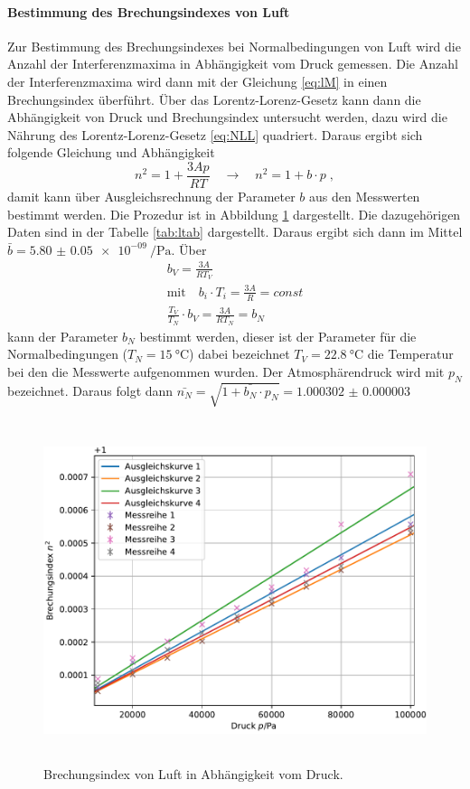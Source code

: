 \paragraph{Bestimmung des Brechungsindexes von Luft}
Zur Bestimmung des Brechungsindexes bei Normalbedingungen von Luft wird die Anzahl der Interferenzmaxima 
in Abhängigkeit vom Druck gemessen. Die Anzahl der Interferenzmaxima wird dann mit der Gleichung 
\eqref{eq:lM} in einen Brechungsindex überführt. Über das Lorentz-Lorenz-Gesetz kann dann die 
Abhängigkeit von Druck und Brechungsindex untersucht werden, dazu wird die Nährung des Lorentz-Lorenz-Gesetz 
\eqref{eq:NLL} quadriert. 
Daraus ergibt sich folgende Gleichung und Abhängigkeit
\begin{equation}
n^2 = 1 + \frac{3Ap}{RT} \quad \rightarrow \quad n^2 = 1+ b \cdot p \; ,
\label{eq:brechl}
\end{equation}
damit kann über Ausgleichsrechnung der Parameter $b$ aus den Messwerten bestimmt werden. 
Die Prozedur ist in Abbildung \ref{fig:Lplot} dargestellt. 
Die dazugehörigen Daten sind in der Tabelle \ref{tab:ltab} dargestellt. 
Daraus ergibt sich dann im Mittel $ \bar{b} = \SI{5.80(5)e-09}{\per\Pa}$. 
Über 
\begin{gather}
b_V =  \frac{3A}{RT_V} \\ 
\text{mit} \quad b_i \cdot T_i = \frac{3A}{R} = const\\
\frac{T_V}{T_N} \cdot b_V =\frac{3A}{RT_N} = b_N
\end{gather}
kann der Parameter $b_N$ bestimmt werden, dieser ist der Parameter für die Normalbedingungen 
($T_N = \SI{15}{\celsius}$) dabei bezeichnet $T_V = \SI{22,8}{\celsius}$ die Temperatur bei den die 
Messwerte aufgenommen wurden. Der Atmosphärendruck wird mit $p_N$ bezeichnet. 
Daraus folgt dann $ \bar{n_{N}} = \sqrt{ 1 +  \bar{b_{N}}\cdot p_{N}} = \SI{1.000302(3)}{}$
\begin{figure}
  \centering
  \includegraphics[height = 10cm]{plots/Luftplot.pdf}
  \caption{Brechungsindex von Luft in Abhängigkeit vom Druck.}
  \label{fig:Lplot}
\end{figure}


